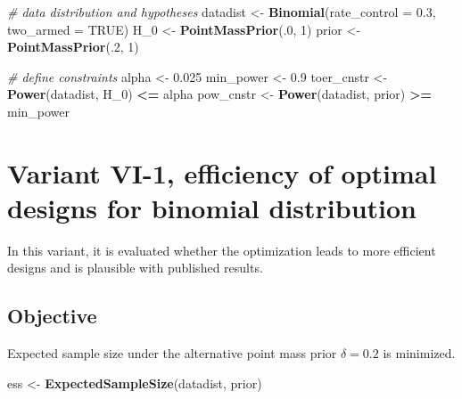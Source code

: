 \documentclass[
]{book}
\newenvironment{Shaded}{\begin{snugshade}}{\end{snugshade}}
\newcommand{\CommentTok}[1]{\textcolor[rgb]{0.56,0.35,0.01}{\textit{#1}}}
\newcommand{\DataTypeTok}[1]{\textcolor[rgb]{0.13,0.29,0.53}{#1}}
\newcommand{\DecValTok}[1]{\textcolor[rgb]{0.00,0.00,0.81}{#1}}
\newcommand{\FloatTok}[1]{\textcolor[rgb]{0.00,0.00,0.81}{#1}}
\newcommand{\KeywordTok}[1]{\textcolor[rgb]{0.13,0.29,0.53}{\textbf{#1}}}
\newcommand{\NormalTok}[1]{#1}
\newcommand{\OperatorTok}[1]{\textcolor[rgb]{0.81,0.36,0.00}{\textbf{#1}}}
\newcommand{\OtherTok}[1]{\textcolor[rgb]{0.56,0.35,0.01}{#1}}
\newcommand{\StringTok}[1]{\textcolor[rgb]{0.31,0.60,0.02}{#1}}
\begin{document}
\begin{Shaded}
\begin{Highlighting}[]
\CommentTok{\# data distribution and hypotheses}
\NormalTok{datadist   \textless{}{-}}\StringTok{ }\KeywordTok{Binomial}\NormalTok{(}\DataTypeTok{rate\_control =} \FloatTok{0.3}\NormalTok{, }\DataTypeTok{two\_armed =} \OtherTok{TRUE}\NormalTok{)}
\NormalTok{H\_}\DecValTok{0}\NormalTok{        \textless{}{-}}\StringTok{ }\KeywordTok{PointMassPrior}\NormalTok{(.}\DecValTok{0}\NormalTok{, }\DecValTok{1}\NormalTok{)}
\NormalTok{prior      \textless{}{-}}\StringTok{ }\KeywordTok{PointMassPrior}\NormalTok{(.}\DecValTok{2}\NormalTok{, }\DecValTok{1}\NormalTok{)}

\CommentTok{\# define constraints}
\NormalTok{alpha      \textless{}{-}}\StringTok{ }\FloatTok{0.025}
\NormalTok{min\_power  \textless{}{-}}\StringTok{ }\FloatTok{0.9}
\NormalTok{toer\_cnstr \textless{}{-}}\StringTok{ }\KeywordTok{Power}\NormalTok{(datadist, H\_}\DecValTok{0}\NormalTok{)   }\OperatorTok{\textless{}=}\StringTok{ }\NormalTok{alpha}
\NormalTok{pow\_cnstr  \textless{}{-}}\StringTok{ }\KeywordTok{Power}\NormalTok{(datadist, prior) }\OperatorTok{\textgreater{}=}\StringTok{ }\NormalTok{min\_power}
\end{Highlighting}
\end{Shaded}

\hypertarget{variantVI_1}{%
\section{Variant VI-1, efficiency of optimal designs for binomial distribution}\label{variantVI_1}}

In this variant, it is evaluated whether the optimization leads to more
efficient designs and is plausible with published results.

\hypertarget{objective-14}{%
\subsection{Objective}\label{objective-14}}

Expected sample size under the alternative point mass prior \(\delta = 0.2\)
is minimized.

\begin{Shaded}
\begin{Highlighting}[]
\NormalTok{ess \textless{}{-}}\StringTok{ }\KeywordTok{ExpectedSampleSize}\NormalTok{(datadist, prior)}
\end{Highlighting}
\end{Shaded}
\end{document}
